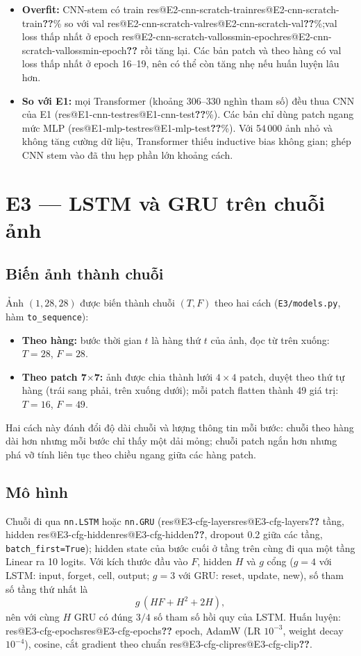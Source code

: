 \documentclass[twoside,final]{hcmut-report}
\makeatletter
\newcommand{\res}[1]{\ifcsname res@#1\endcsname\csname res@#1\endcsname\else\textbf{??}\fi}
\makeatother
\begin{document}
\begin{itemize}
  \item \textbf{Overfit:} CNN-stem có train \res{E2-cnn-scratch-train}\% so với val \res{E2-cnn-scratch-val}\%;val loss thấp nhất ở epoch \res{E2-cnn-scratch-vallossmin-epoch} rồi tăng lại. Các bản patch và theo hàng có val loss thấp nhất ở epoch 16--19, nên có thể còn tăng nhẹ nếu huấn luyện lâu hơn.
  \item \textbf{So với E1:} mọi Transformer (khoảng 306--330 nghìn tham số) đều thua CNN của E1 (\res{E1-cnn-test}\%). Các bản chỉ dùng patch ngang mức MLP (\res{E1-mlp-test}\%). Với 54\,000 ảnh nhỏ và không tăng cường dữ liệu, Transformer thiếu inductive bias không gian; ghép CNN stem vào đã thu hẹp phần lớn khoảng cách.
\end{itemize}

\section{E3 — LSTM và GRU trên chuỗi ảnh}

\subsection{Biến ảnh thành chuỗi}
Ảnh $(1,28,28)$ được biến thành chuỗi $(T, F)$ theo hai cách (\texttt{E3/models.py}, hàm \texttt{to\_sequence}):
\begin{itemize}
  \item \textbf{Theo hàng:} bước thời gian $t$ là hàng thứ $t$ của ảnh, đọc từ trên xuống: $T=28$, $F=28$.
  \item \textbf{Theo patch 7$\times$7:} ảnh được chia thành lưới $4\times4$ patch, duyệt theo thứ tự hàng
        (trái sang phải, trên xuống dưới); mỗi patch flatten thành 49 giá trị: $T=16$, $F=49$.
\end{itemize}
Hai cách này đánh đổi độ dài chuỗi và lượng thông tin mỗi bước: chuỗi theo hàng dài hơn nhưng mỗi bước chỉ
thấy một dải mỏng; chuỗi patch ngắn hơn nhưng phá vỡ tính liên tục theo chiều ngang giữa các hàng patch.

\subsection{Mô hình}
Chuỗi đi qua \texttt{nn.LSTM} hoặc \texttt{nn.GRU} (\res{E3-cfg-layers} tầng, hidden \res{E3-cfg-hidden},
dropout 0.2 giữa các tầng, \texttt{batch\_first=True}); hidden state của bước cuối ở tầng trên cùng đi qua
một tầng Linear ra 10 logits. Với kích thước đầu vào $F$, hidden $H$ và $g$ cổng
($g=4$ với LSTM: input, forget, cell, output; $g=3$ với GRU: reset, update, new), số tham số tầng thứ nhất là
\[ g\,(HF + H^2 + 2H), \]
nên với cùng $H$ GRU có đúng $3/4$ số tham số hồi quy của LSTM. Huấn luyện: \res{E3-cfg-epochs} epoch,
AdamW (LR $10^{-3}$, weight decay $10^{-4}$), cosine, cắt gradient theo chuẩn \res{E3-cfg-clip}.
\end{document}
